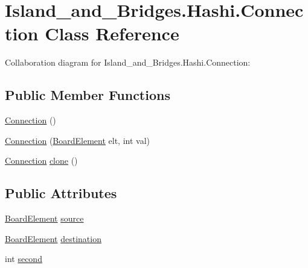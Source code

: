 \hypertarget{class_island__and___bridges_1_1_hashi_1_1_connection}{}\section{Island\+\_\+and\+\_\+\+Bridges.\+Hashi.\+Connection Class Reference}
\label{class_island__and___bridges_1_1_hashi_1_1_connection}


Collaboration diagram for Island\+\_\+and\+\_\+\+Bridges.\+Hashi.\+Connection\+:
\subsection*{Public Member Functions}
\begin{DoxyCompactItemize}
\item 
\mbox{\hyperlink{class_island__and___bridges_1_1_hashi_1_1_connection_a554863effae4cee82acf6ad90ef54dbf}{Connection}} ()
\item 
\mbox{\hyperlink{class_island__and___bridges_1_1_hashi_1_1_connection_af62edff953b7b21717c32c03009f4b8a}{Connection}} (\mbox{\hyperlink{class_island__and___bridges_1_1_hashi_1_1_board_element}{Board\+Element}} elt, int val)
\item 
\mbox{\hyperlink{class_island__and___bridges_1_1_hashi_1_1_connection}{Connection}} \mbox{\hyperlink{class_island__and___bridges_1_1_hashi_1_1_connection_a908aac3e0d7d953d4b9899922548ac6e}{clone}} ()
\end{DoxyCompactItemize}
\subsection*{Public Attributes}
\begin{DoxyCompactItemize}
\item 
\mbox{\hyperlink{class_island__and___bridges_1_1_hashi_1_1_board_element}{Board\+Element}} \mbox{\hyperlink{class_island__and___bridges_1_1_hashi_1_1_connection_a4422e2d5803d43a2950742eae23c2726}{source}}
\item 
\mbox{\hyperlink{class_island__and___bridges_1_1_hashi_1_1_board_element}{Board\+Element}} \mbox{\hyperlink{class_island__and___bridges_1_1_hashi_1_1_connection_a79670917c673d238fa4da2b6085014f8}{destination}}
\item 
int \mbox{\hyperlink{class_island__and___bridges_1_1_hashi_1_1_connection_af01faf616ba34d475190bc1cb1f7a228}{second}}
\end{DoxyCompactItemize}


